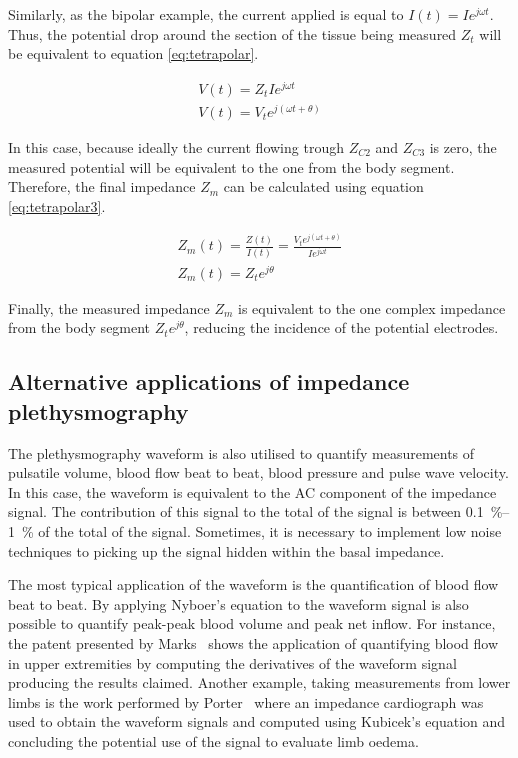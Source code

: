 Similarly, as the bipolar example, the current applied is equal to $I(t)=I e^{j \omega t}$. Thus, the potential drop around the section of the tissue being measured $Z_t$ will be equivalent to equation \ref{eq:tetrapolar}.

\begin{gather}
	\label{eq:tetrapolar}
	V(t) = Z_t I e^{j \omega t} \\
	\label{eq:tetrapolar2}
	V(t) = V_t e^{j (\omega t + \theta)}
\end{gather} 

In this case, because ideally the current flowing trough $Z_{C2}$ and $Z_{C3}$ is zero, the measured potential will be equivalent to the one from the body segment. Therefore, the final impedance $Z_m$ can be calculated using equation \ref{eq:tetrapolar3}.

\begin{gather}
	\label{eq:tetrapolar3}
	Z_m(t) = \frac{Z(t)}{I(t)} = \frac{V_t e^{j(\omega t + \theta)}}{I e^{j\omega t}} \\
	\label{eq:tetrapolar4}
	Z_m(t) = Z_t e^{j \theta}
\end{gather}

Finally, the measured impedance $Z_m$ is equivalent to the one complex impedance from the body segment $Z_t e^{j \theta}$, reducing the incidence of the potential electrodes. 

\subsection{Alternative applications of impedance plethysmography}
The plethysmography waveform is also utilised to quantify measurements of pulsatile volume, blood flow beat to beat, blood pressure and pulse wave velocity. In this case, the waveform is equivalent to the AC component of the impedance signal. The contribution of this signal to the total of the signal is between \SIrange{0.1}{1}{\percent} of the total of the signal. Sometimes, it is necessary to implement low noise techniques to picking up the signal hidden within the basal impedance. 

The most typical application of the waveform is the quantification of blood flow beat to beat. By applying Nyboer's equation to the waveform signal is also possible to quantify peak-peak blood volume and peak net inflow. For instance, the patent presented by Marks~\cite{marks1985computer} shows the application of quantifying blood flow in upper extremities by computing the derivatives of the waveform signal producing the results claimed. Another example, taking measurements from lower limbs is the work performed by Porter~\cite{porter1985measurement} where an impedance cardiograph was used to obtain the waveform signals and computed using Kubicek's equation \cite{karnegis1966development, kubicek1970impedance, kubicek1979impedance} and concluding the potential use of the signal to evaluate limb oedema. 

